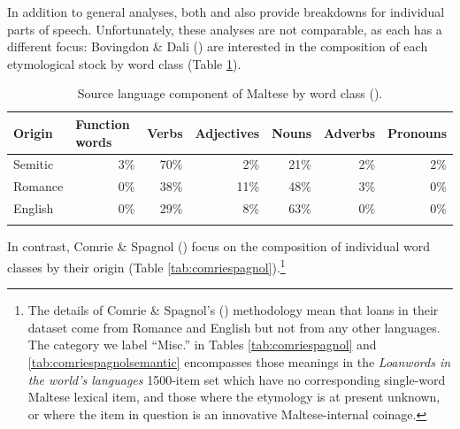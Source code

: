 \documentclass[output=paper]{langsci/langscibook}
\begin{document}
In addition to general analyses, both \cite{bovingdondalli2006} and \cite{comriespagnol2016} also provide breakdowns for individual parts of speech. Unfortunately, these analyses are not comparable, as each has a different focus: Bovingdon \& Dali (\citeyear[71]{bovingdondalli2006}) are interested in the composition of each etymological stock by word class (Table \ref{tab:posbovingdon}).
\begin{table}[H]
\caption{Source language component of Maltese by word class (\citealt[71]{bovingdondalli2006}).}
\label{tab:posbovingdon}
\begin{tabular}{lllllll}
\lsptoprule
Origin & Function words & Verbs & Adjectives & Nouns & Adverbs & Pronouns\\
\midrule
Semitic & \multicolumn{1}{r}{3\%} & \multicolumn{1}{r}{70\%} & \multicolumn{1}{r}{2\%} 
& \multicolumn{1}{r}{21\%} & \multicolumn{1}{r}{2\%} & \multicolumn{1}{r}{2\%} \\
Romance & \multicolumn{1}{r}{0\%} & \multicolumn{1}{r}{38\%} & \multicolumn{1}{r}{11\%} 
& \multicolumn{1}{r}{48\%} & \multicolumn{1}{r}{3\%} & \multicolumn{1}{r}{0\%} \\
English & \multicolumn{1}{r}{0\%} & \multicolumn{1}{r}{29\%} & \multicolumn{1}{r}{8\%} & \multicolumn{1}{r}{63\%}
& \multicolumn{1}{r}{0\%} & \multicolumn{1}{r}{0\%} \\
\lspbottomrule
\end{tabular}
\end{table}
In contrast, Comrie \& Spagnol (\citeyear[328]{comriespagnol2016}) focus on the composition of individual word classes by their origin (Table \ref{tab:comriespagnol}).\footnote{The details of Comrie \& Spagnol's (\citeyear{comriespagnol2016}) methodology mean that loans in their dataset come from Romance and English but not from any other languages. The category we label ``Misc.'' in Tables \ref{tab:comriespagnol} and \ref{tab:comriespagnolsemantic} encompasses those meanings in the \textit{Loanwords in the world's languages} 1500-item set which have no corresponding single-word Maltese lexical item, and those where the etymology is at present unknown, or where the item in question is an innovative Maltese-internal coinage.}
\end{document}
